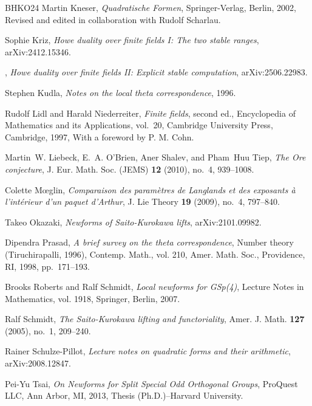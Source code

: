 \documentclass[12pt]{amsart}
\theoremstyle{definition}
\theoremstyle{remark}
\begin{document}
\begin{thebibliography}{BHKO24}
Martin Kneser, \emph{Quadratische {F}ormen}, Springer-Verlag, Berlin, 2002,
  Revised and edited in collaboration with Rudolf Scharlau. 
  
Sophie Kriz, \emph{Howe duality over finite fields {I}: The two stable ranges}, 	arXiv:2412.15346.

\bysame, \emph{Howe duality over finite fields {II}: Explicit stable
  computation}, arXiv:2506.22983.

Stephen Kudla, \emph{Notes on the local theta correspondence}, 1996.

Rudolf Lidl and Harald Niederreiter, \emph{Finite fields}, second ed.,
  Encyclopedia of Mathematics and its Applications, vol.~20, Cambridge
  University Press, Cambridge, 1997, With a foreword by P. M. Cohn.

Martin~W. Liebeck, E.~A. O'Brien, Aner Shalev, and Pham~Huu Tiep, \emph{The
  {O}re conjecture}, J. Eur. Math. Soc. (JEMS) \textbf{12} (2010), no.~4,
  939--1008. 

Colette M{\oe}glin, \emph{Comparaison des param\`etres de {L}anglands et des
  exposants \`a l'int\'{e}rieur d'un paquet d'{A}rthur}, J. Lie Theory
  \textbf{19} (2009), no.~4, 797--840. 

Takeo Okazaki, \emph{Newforms of {S}aito-{K}urokawa lifts}, arXiv:2101.09982.

Dipendra Prasad, \emph{A brief survey on the theta correspondence}, Number
  theory ({T}iruchirapalli, 1996), Contemp. Math., vol. 210, Amer. Math. Soc.,
  Providence, RI, 1998, pp.~171--193. 

Brooks Roberts and Ralf Schmidt, \emph{Local newforms for {GS}p(4)}, Lecture
  Notes in Mathematics, vol. 1918, Springer, Berlin, 2007. 

Ralf Schmidt, \emph{The {S}aito-{K}urokawa lifting and functoriality}, Amer. J.
  Math. \textbf{127} (2005), no.~1, 209--240. 
  
Rainer Schulze-Pillot, \emph{Lecture notes on quadratic forms and their
  arithmetic}, arXiv:2008.12847.

Pei-Yu Tsai, \emph{On {N}ewforms for {S}plit {S}pecial {O}dd {O}rthogonal
  {G}roups}, ProQuest LLC, Ann Arbor, MI, 2013, Thesis (Ph.D.)--Harvard
  University. 


\end{thebibliography}
\end{document}
